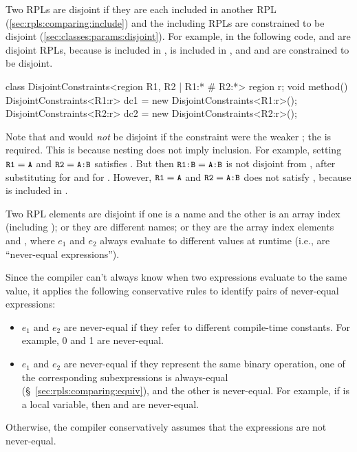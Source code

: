  Two RPLs are disjoint if they are
each included in another RPL (\ref{sec:rpls:comparing:include}) and
the including RPLs are constrained to be disjoint
(\ref{sec:classes:params:disjoint}).  For example, in the following
code,  and  are disjoint RPLs, because 
is included in ,  is included in , and
 and  are constrained to be disjoint.
%
\begin{dpjlisting}
class DisjointConstraints<region R1, R2 | R1:* # R2:*> {
    region r;
    void method() {
        DisjointConstraints<R1:r> dc1 =
            new DisjointConstraints<R1:r>();
        DisjointConstraints<R2:r> dc2 =
            new DisjointConstraints<R2:r>();
    }
}
\end{dpjlisting}

Note that  and  would \emph{not} be disjoint if
the constraint were the weaker ; the \kwd{*} is
required.  This is because nesting does not imply inclusion.  For
example, setting $\mbox{\small{\texttt{R1}}}=\mbox{\small{\texttt{A}}}$ and $\mbox{\small{\texttt{R2}}}=\mbox{\small{\texttt{A:B}}}$ satisfies
.  But then $\mbox{\small{\texttt{R1:B}}}=\mbox{\small{\texttt{A:B}}}$ is not disjoint from
, after substituting  for  and  for
.  However, $\mbox{\small{\texttt{R1}}}=\mbox{\small{\texttt{A}}}$ and $\mbox{\small{\texttt{R2}}}=\mbox{\small{\texttt{A:B}}}$ does
not satisfy , because  is included in
.


 Two RPL elements are disjoint if one
is a name and the other is an array index (including \kwd{[?]}); or
they are different names; or they are the array index elements
\kwd{[$e_1$]} and \kwd{[$e_2$]}, where $e_1$ and $e_2$ always evaluate
to different values at runtime (i.e., are ``never-equal
expressions'').

Since the compiler can't always know when two expressions evaluate to
the same value, it applies the following conservative rules to
identify pairs of never-equal expressions:
%
\begin{itemize}
%
\item $e_1$ and $e_2$ are never-equal if they refer to different
  compile-time constants.  For example, 0 and 1 are never-equal.
%
\item $e_1$ and $e_2$ are never-equal if they represent the same
  binary operation, one of the corresponding subexpressions is
  always-equal (\S~\ref{sec:rpls:comparing:equiv}), and the other is
  never-equal.  For example, if  is a  local
  variable, then  and  are never-equal.
%
\end{itemize}
%
Otherwise, the compiler conservatively assumes that the expressions
are not never-equal.

